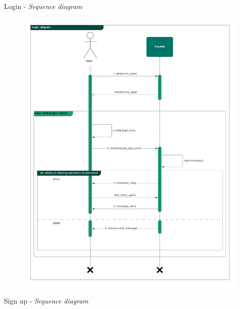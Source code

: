 \documentclass{article}
\begin{document}
\begin{legal}
\begin{legal}
\begin{legal}
{\begin{legal}
			\item Login - \textit{ Sequence diagram}
				\begin{figure}[H]
				\center
  				\includegraphics[width=160mm]{../images/seq-diagrams/Login_diagram.png}
				\end{figure}
			\newpage
			\item Sign up - \textit{ Sequence diagram}
				\begin{figure}[H]
				\center

\end{figure}
\end{legal}}
\end{legal}
\end{legal}
\end{legal}
\end{document}
